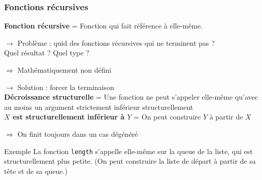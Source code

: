 \documentclass[9pt]{beamer}
\newenvironment{ex}[1][Exemple]{\begin{exampleblock}{#1}}{\end{exampleblock}}
\newenvironment{warn}[1][Attention]{\begin{alertblock}{#1}}{\end{alertblock}}
\newcommand{\defi}[1]{\textbf{#1}}
\begin{document}
\begin{frame}
\frametitle{Fonctions récursives}

\defi{Fonction récursive} = Fonction qui fait référence à elle-même.

\medskip
$\rightarrow$ Problème : quid des fonctions récursives qui ne terminent pas ?\\
Quel résultat ? Quel type ?
\begin{warn}[]
\centering$\Rightarrow$ Mathématiquement non défini
\end{warn}

\pause
\medskip
$\rightarrow$ Solution : forcer la terminaison\\
\defi{Décroissance structurelle} = Une fonction ne peut s'appeler elle-même qu'avec au moins un argument strictement inférieur structurellement\\
\defi{$X$ est structurellement inférieur à $Y$} = On peut construire $Y$ à partir de $X$\\
\begin{ex}[]
\centering$\Rightarrow$ On finit toujours dans un cas dégénéré
\end{ex}

\pause
\begin{ex}
La fonction \texttt{length} s'appelle elle-même sur la queue de la liste, qui est structurellement plus petite. (On peut construire la liste de départ à partir de sa tête et de sa queue.)
\end{ex}

\end{frame}
\end{document}
